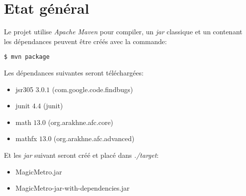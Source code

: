 \documentclass[report, backcover, french, nodocumentinfo]{upmethodology-document}
\begin{document}
	\upmdocumentsummary{}
	\upmdocumentauthors{}
	\upmdocumentinformedpeople{}
	\upmpublicationpage{}

	\newpage{}
	\section*{Etat général}
		\p{}
			Le projet utilise \textit{Apache Maven} pour compiler, un \textit{jar} classique et un contenant les dépendances peuvent être créés avec la commande:
			\begin{Verbatim}[frame=single]
$ mvn package
			\end{Verbatim}
			Les dépendances suivantes seront téléchargées:
			\begin{itemize}
				\item jsr305 $3.0.1$ (com.google.code.findbugs)
				\item junit $4.4$ (junit)
				\item math $13.0$ (org.arakhne.afc.core)
				\item mathfx $13.0$ (org.arakhne.afc.advanced)
			\end{itemize}
			Et les \textit{jar} suivant seront créé et placé dans \textit{./target}:
			\begin{itemize}
				\item MagicMetro.jar
				\item MagicMetro-jar-with-dependencies.jar
			\end{itemize}
\end{document}
